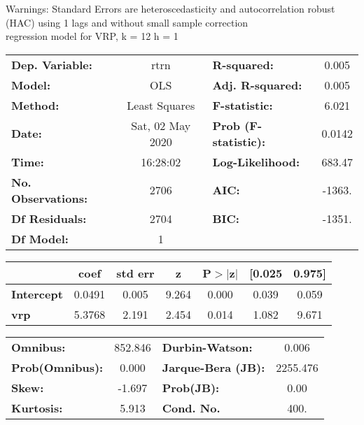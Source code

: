 Warnings: \newline
 [1] Standard Errors are heteroscedasticity and autocorrelation robust (HAC) using 1 lags and without small sample correction\\ 

regression model for VRP, k = 12 h = 1\begin{center}
\begin{tabular}{lclc}
\toprule
\textbf{Dep. Variable:}    &       rtrn       & \textbf{  R-squared:         } &     0.005   \\
\textbf{Model:}            &       OLS        & \textbf{  Adj. R-squared:    } &     0.005   \\
\textbf{Method:}           &  Least Squares   & \textbf{  F-statistic:       } &     6.021   \\
\textbf{Date:}             & Sat, 02 May 2020 & \textbf{  Prob (F-statistic):} &   0.0142    \\
\textbf{Time:}             &     16:28:02     & \textbf{  Log-Likelihood:    } &    683.47   \\
\textbf{No. Observations:} &        2706      & \textbf{  AIC:               } &    -1363.   \\
\textbf{Df Residuals:}     &        2704      & \textbf{  BIC:               } &    -1351.   \\
\textbf{Df Model:}         &           1      & \textbf{                     } &             \\
\bottomrule
\end{tabular}
\begin{tabular}{lcccccc}
                   & \textbf{coef} & \textbf{std err} & \textbf{z} & \textbf{P$> |$z$|$} & \textbf{[0.025} & \textbf{0.975]}  \\
\midrule
\textbf{Intercept} &       0.0491  &        0.005     &     9.264  &         0.000        &        0.039    &        0.059     \\
\textbf{vrp}       &       5.3768  &        2.191     &     2.454  &         0.014        &        1.082    &        9.671     \\
\bottomrule
\end{tabular}
\begin{tabular}{lclc}
\textbf{Omnibus:}       & 852.846 & \textbf{  Durbin-Watson:     } &    0.006  \\
\textbf{Prob(Omnibus):} &   0.000 & \textbf{  Jarque-Bera (JB):  } & 2255.476  \\
\textbf{Skew:}          &  -1.697 & \textbf{  Prob(JB):          } &     0.00  \\
\textbf{Kurtosis:}      &   5.913 & \textbf{  Cond. No.          } &     400.  \\
\bottomrule
\end{tabular}
\end{center}

